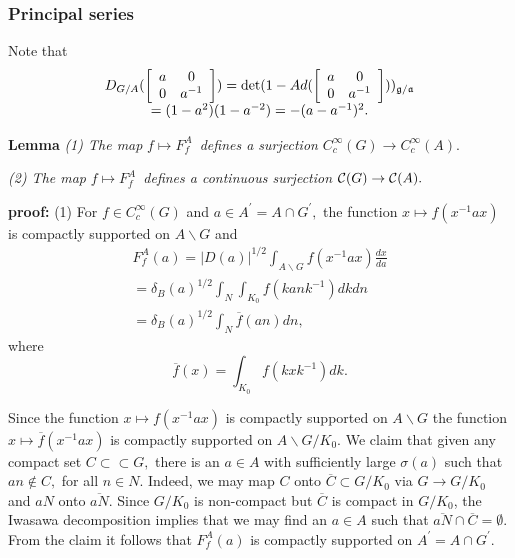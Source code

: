 \subsubsection{Principal series}

Note that 
\[
\begin{array}{c}
D_{G/A}(\left[ 
\begin{array}{cc}
a & 0 \\ 
0 & a^{-1}
\end{array}
\right] )=\det (1-Ad(\left[ 
\begin{array}{cc}
a & 0 \\ 
0 & a^{-1}
\end{array}
\right] ))_{{\frak g}/{\frak a}} \\ 
=(1-a^2)(1-a^{-2})=-(a-a^{-1})^2.
\end{array}
\]

{\bf Lemma} {\em (1) The map }$f\longmapsto F_f^A${\em \ defines a
surjection }$C_c^\infty (G)\rightarrow C_c^\infty (A).$

{\em (2) The map }$f\longmapsto F_f^A${\em \ defines a continuous surjection 
}${\cal C}(G)\rightarrow {\cal C}(A).$

{\bf proof:} (1) For $f\in C_c^\infty (G)$ and $a\in A^{\prime }=A\cap
G^{\prime },$ the function $x\longmapsto f(x^{-1}ax)$ is compactly supported
on $A\backslash G$ and 
\[
\begin{array}{c}
F_f^A(a)=|D(a)|^{1/2}\int_{A\backslash G}f(x^{-1}ax) \frac{dx}{da} \\ 
=\delta _B(a)^{1/2}\int_N\int_{K_0}f(kank^{-1})dkdn \\ 
=\delta _B(a)^{1/2}\int_N\overline{f}(an)dn,
\end{array}
\]
where 
\[
\overline{f}(x)=\int_{K_0}f(kxk^{-1})dk. 
\]

Since the function $x\longmapsto f(x^{-1}ax)$ is compactly supported on $%
A\backslash G$ the function $x\longmapsto \overline{f}(x^{-1}ax)$ is
compactly supported on $A\backslash G/K_0.$ We claim that given any compact
set $C\subset \subset G,$ there is an $a\in A$ with sufficiently large $%
\sigma (a)$ such that $an\notin C,$ for all $n\in N.$ Indeed, we may map $C$
onto $\overline{C}\subset G/K_0$ via $G\rightarrow G/K_0$ and $aN$ onto $%
\overline{aN}$. Since $G/K_0$ is non-compact but $\overline{C}$ is compact
in $G/K_0$, the Iwasawa decomposition implies that we may find an $a\in A$
such that $\overline{aN}\cap \overline{C}=\emptyset $. From the claim it
follows that $F_f^A(a)$ is compactly supported on $A^{\prime }=A\cap
G^{\prime }.$

